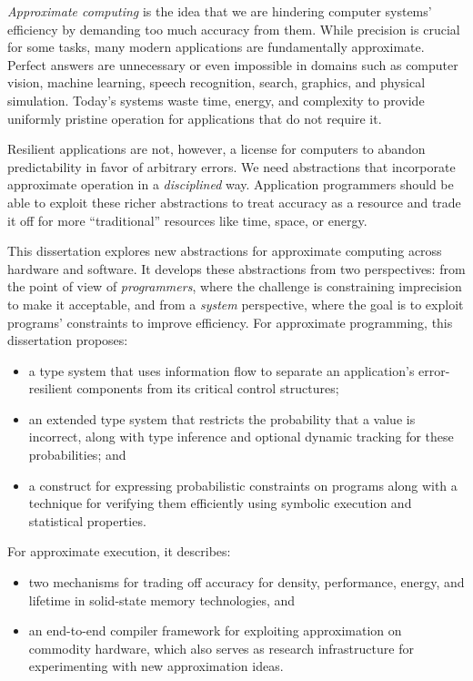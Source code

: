 \emph{Approximate computing} is the idea that we are hindering computer
systems' efficiency by demanding too much accuracy from them.
While precision is crucial for some tasks, many
modern applications are fundamentally approximate.
Perfect answers are unnecessary or even impossible in domains such as
computer vision, machine learning,
speech recognition, search, graphics, and physical simulation.
Today's systems waste time, energy, and complexity to provide uniformly
pristine operation for applications that do not require it.

Resilient applications are not, however, a license for computers to abandon
predictability in favor of arbitrary errors.
We need abstractions that incorporate approximate operation in a
\emph{disciplined} way.
Application programmers should be able to exploit these richer abstractions to
treat accuracy as a resource and trade it off for more ``traditional''
resources like time, space, or energy.

This dissertation explores new abstractions for approximate computing across
hardware and software.
It develops these abstractions from two perspectives:
from the point of view of \emph{programmers}, where the challenge is
constraining imprecision to make it acceptable,
and from a \emph{system} perspective, where the goal is to exploit programs'
constraints to improve efficiency.
For approximate programming, this dissertation proposes:
%
\begin{itemize}
\item
a type system that uses information flow to separate an
application's error-resilient components from its critical control structures;
\item
an extended type system that restricts the probability that a value
is incorrect, along with type inference and optional dynamic tracking for
these probabilities; and
\item
a construct for expressing probabilistic constraints on programs along with a
technique for verifying them efficiently using symbolic execution and
statistical properties.
\end{itemize}
%
For approximate execution, it describes:
%
\begin{itemize}
\item
two mechanisms for trading off accuracy for density, performance, energy, and
lifetime in solid-state memory technologies, and
\item
an end-to-end compiler framework for exploiting approximation on
commodity hardware, which also serves as research infrastructure for
experimenting with new approximation ideas.
\end{itemize}
